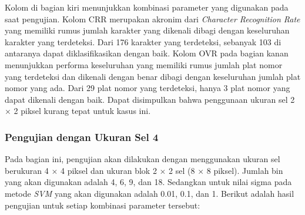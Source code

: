 \noindent Kolom di bagian kiri menunjukkan kombinasi parameter yang digunakan pada saat pengujian. Kolom CRR merupakan akronim dari \textit{Character Recognition Rate} yang memiliki rumus jumlah karakter yang dikenali dibagi dengan keseluruhan karakter yang terdeteksi. Dari 176 karakter yang terdeteksi, sebanyak 103 di antaranya dapat diklasifikasikan dengan baik. Kolom OVR pada bagian kanan menunjukkan performa keseluruhan yang memiliki rumus jumlah plat nomor yang terdeteksi dan dikenali dengan benar dibagi dengan keseluruhan jumlah plat nomor yang ada. Dari 29 plat nomor yang terdeteksi, hanya 3 plat nomor yang dapat dikenali dengan baik. Dapat disimpulkan bahwa penggunaan ukuran sel 2 $\times$ 2 piksel kurang tepat untuk kasus ini.\\
\subsubsection{Pengujian dengan Ukuran Sel 4}
\noindent Pada bagian ini, pengujian akan dilakukan dengan menggunakan ukuran sel berukuran 4 $\times$ 4 piksel dan ukuran blok 2 $\times$ 2 sel (8 $\times$ 8 piksel). Jumlah bin yang akan digunakan adalah 4, 6, 9, dan 18. Sedangkan untuk nilai sigma pada metode \textit{SVM} yang akan digunakan adalah 0.01, 0.1, dan 1. Berikut adalah hasil pengujian untuk setiap kombinasi parameter tersebut:
